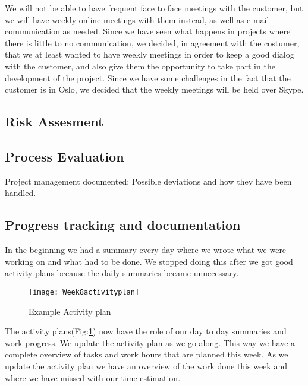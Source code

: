     We will not be able to have frequent face to face meetings with the customer, but we will have weekly online meetings with them instead, as well as e-mail communication as needed. Since we have seen what happens in projects where there is little to no communication, we decided, in agreement with the costumer, that we at least wanted to have weekly meetings in order to keep a good dialog with the customer, and also give them the opportunity to take part in the development of the project. Since we have some challenges in the fact that the customer is in Oslo, we decided that the weekly meetings will be held over Skype.
    
    \subsection{Risk Assesment}\label{risk}
    
    \subsection{Process Evaluation}\label{processevaluation}
    
    Project management documented: 
    Possible deviations and how they have
been handled. 

    \subsection{Progress tracking and documentation}\label{progress}
    In the beginning we had a summary every day where we wrote what we were working on and what had to be done. We stopped doing this after we got good activity plans because the daily summaries became unnecessary. 
    
    \begin{figure}[h]
        \centering
        \texttt{[image: Week8activityplan]}
        \caption{Example Activity plan}
        \label{fig:activityplan}
    \end{figure}
    
    The activity plans(Fig:\ref{fig:activityplan}) now have the role of our day to day summaries and work progress. We update the activity plan as we go along. This way we have a complete overview of tasks and work hours that are planned this week. As we update the activity plan we have an overview of the work done this week and where we have missed with our time estimation. 
    
